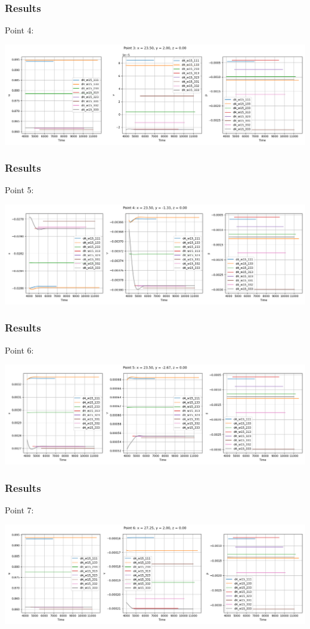 \documentclass[
	aspectratio=169, %
	t, %
	onlytextwidth, %
	10pt, %
]{beamer}
\begin{document}
\begin{frame}
	\frametitle{Results}
	Point 4:

	\centering
	\includegraphics[width=\linewidth]{Images/point4.png}
\end{frame}
\begin{frame}
	\frametitle{Results}
	Point 5:

	\centering
	\includegraphics[width=\linewidth]{Images/point5.png}
\end{frame}
\begin{frame}
	\frametitle{Results}
	Point 6:

	\centering
	\includegraphics[width=\linewidth]{Images/point6.png}
\end{frame}
\begin{frame}
	\frametitle{Results}
	Point 7:

	\centering
	\includegraphics[width=\linewidth]{Images/point7.png}
\end{frame}
\end{document}
